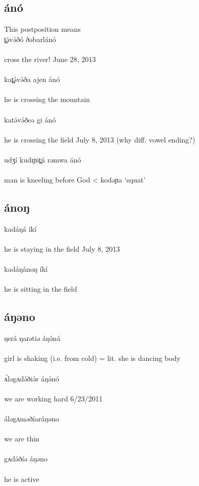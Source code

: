 \subsection{ánó}
This postposition means 
\\
\gll t̪ə́və́ðó ðəbarlánó\\
\\
\trans	cross the river!	 \hfill	June 28, 2013\\
\\
\gll kat̪ə́və́ða ajen ánó\\
\\
\trans	he is crossing the mountain\\
\\
\gll katə́və́ðeə gi ánó\\
\\
\trans	he is crossing the field		\hfill July 8, 2013  (why diff. vowel ending?)\\
\\
\gll udʒí kudɪɲit̪ú rəmwa ánó\\
\\
\trans man is kneeling before God	< kodəɲa	‘squat’\\

\subsection{ánoŋ}
\gll kadáŋá íkí\\
\\
\trans he is staying in the field	\hfill	July 8, 2013\\
\\
\gll kadáŋánoŋ íkí\\
\\
\trans he is sitting in the field\\

\subsection{áŋəno}
\gll ŋeɾá ŋaɾətiə áŋə́ná\\
\\
\trans	girl is shaking (i.e. from cold) = lit. she is dancing body \\
\\
\gll ʌ́ləgʌdə́ðiə́r áŋə́nó\\
\\
\trans	we are working hard		\hfill 6/23/2011\\
\\
\gll áləgʌməðíaráŋəno\\
\\
\trans	we are thin\\
\\
\gll gʌdə́ðíə áŋəno\\
\\
\trans	he is active\\

